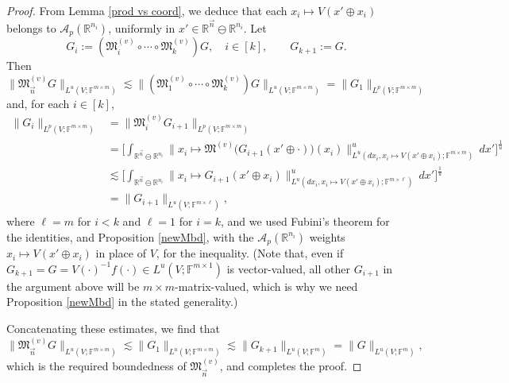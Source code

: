 \documentclass[11pt, reqno]{amsart}
\theoremstyle{definition}
\theoremstyle{remark}
\numberwithin{equation}{section}
\newcommand{\A}{\mathscr A}
\newcommand{\F}{\mathbb F}
\newcommand{\M}{\mathfrak M}
\newcommand{\R}{\mathbb R}
\newcommand{\vn}{\vec n}
\newcommand{\Norm}[2]{\|#1\|_{#2}}
\begin{document}
\begin{proof}
From Lemma \ref{prod vs coord}, we deduce that each $x_i\mapsto V(x'\oplus x_i)$ belongs to $\A_p(\R^{n_i})$, uniformly in $x'\in\R^{\vn}\ominus\R^{n_i}$. Let
\begin{equation*}
G_i:=(\M^{(v)}_{i}\circ\cdots\circ \M^{(v)}_k)G,\quad i\in[k],\qquad G_{k+1}:=G.
\end{equation*}
Then
\begin{equation*}
\Norm{\M^{(v)}_{\vn}G}{L^u(V;\F^{m\times m})}
\lesssim\Norm{(\M^{(v)}_{1}\circ\cdots\circ \M^{(v)}_k)G}{L^u(V;\F^{m\times m})}
=\Norm{G_1}{L^p(V;\F^{m\times m})}
\end{equation*}
and, for each $i\in[k]$,
\begin{align*}
\Norm{G_i}{L^p(V;\F^{m\times m})}
&=\Norm{\M^{(v)}_{i}G_{i+1}}{L^p(V;\F^{m\times m})}  \\
&=\bigg[\int_{\R^{\vn}\ominus\R^{n_i} }
\Norm{x_i\mapsto \M^{(v)}\big(G_{i+1}(x'\oplus\cdot)\big)(x_i)}{L^u(dx_i,x_i\mapsto V(x'\oplus x_i);\F^{m\times m})}^u \, dx'\bigg]^{\frac1u} \\
&\lesssim \bigg[\int_{\R^{\vn}\ominus\R^{n_i} }
\Norm{x_i\mapsto G_{i+1}(x'\oplus x_i)}{L^u(dx_i,x_i\mapsto V(x'\oplus x_i);\F^{m\times\ell})}^u \, dx'\bigg]^{\frac1u} \\
&=\Norm{G_{i+1}}{L^u(V;\F^{m\times\ell})},
\end{align*}
where $\ell=m$ for $i<k$ and $\ell=1$ for $i=k$, and we used Fubini's theorem for the identities, and Proposition \ref{newMbd}, with the $\A_p(\R^{n_i})$ weights $x_i\mapsto V(x'\oplus x_i)$ in place of $V$, for the inequality. (Note that, even if $G_{k+1}=G=V(\cdot)^{-1}f(\cdot)\in L^u(V;\F^{m\times 1})$ is vector-valued, all other $G_{i+1}$ in the argument above will be $m\times m$-matrix-valued, which is why we need Proposition \ref{newMbd} in the stated generality.)

Concatenating these estimates, we find that
\begin{equation*}
\Norm{\M^{(v)}_{\vn}G}{L^u(V;\F^{m\times m})}\lesssim\Norm{G_1}{L^u(V;\F^{m\times m})}
\lesssim\Norm{G_{k+1}}{L^u(V;\F^{m})}=\Norm{G}{L^u(V;\F^m)},
\end{equation*}
which is the required boundedness of $\M^{(v)}_{\vn}$, and completes the proof.
\end{proof}
\end{document}
